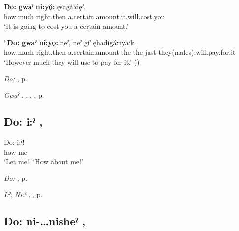 \ea
\label{ex:dpart49}
\gll \textbf{Do:} \textbf{gwaˀ} \textbf{ni:yǫ́:} ęsagá:dęˀ. \\
how.much right.then a.certain.amount it.will.cost.you\\
\glt ‘It is going to cost you a certain amount.’
\z

\ea
\label{ex:dpart50}
\gll “\textbf{Do:} \textbf{gwaˀ} \textbf{ní:yǫ:} neˀ, neˀ giˀ ęhadigá:nyaˀk. \\
how.much right.then a.certain.amount the the just they(males).will.pay.for.it\\
\glt ‘However much they will use to pay for it.’ (\cite{henry_de_2005})
\z

\begin{CayugaRelated}
\item \textit{Do:} , p. \pageref{p:[do:]}\\
\item \textit{Gwaˀ} , , , , p. \pageref{p:[gwaˀ] ‘immediately’}
\end{CayugaRelated}

\subsection*{\textbf{Do: i:ˀ} , } \label{p:[do: i:ˀ]}

\ea
\label{ex:dpart51}
\gll Do: i:ˀ! \\
how me\\
\glt ‘Let me!’ `How about me!’
\z

\begin{CayugaRelated}
\item \textit{Do:} , p. \pageref{p:[do:]}\\
\item \textit{I:ˀ}, \textit{Ni:ˀ} , , p. \pageref{p:[i:ˀ]}
\end{CayugaRelated}

\subsection*{\textbf{Do: ni-…nisheˀ} , } \label{p:[do: ni-…nisheˀ]}

